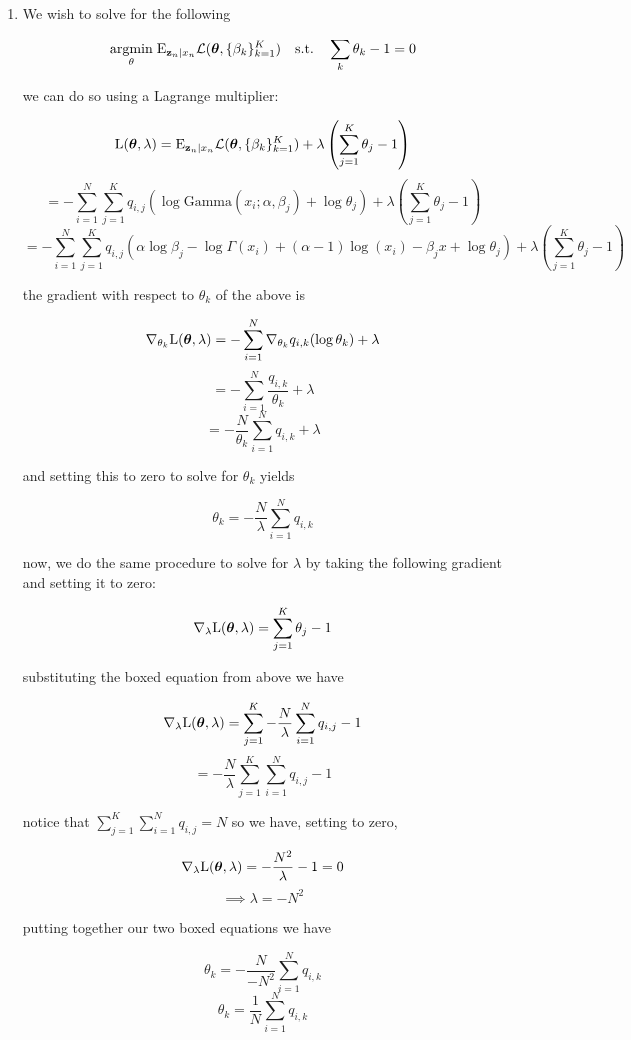 \documentclass[submit]{harvardml}
\begin{document}
\begin{enumerate}
\begin{enumerate}
      \item 
      We wish to solve for the following
      
      $$\underset{\theta}{\mathrm{argmin}}\;\mathrm{E}_{\mathbf{z}_n|x_n}\mathcal{L}(\boldsymbol{\theta},\{\beta_k\}^K_{k=1})\quad\text{s.t.}\quad\sum_k\theta_k -1 = 0$$
      
      we can do so using a Lagrange multiplier:
      
      $$\text{L}(\boldsymbol{\theta}, \lambda) = \mathrm{E}_{\mathbf{z}_n|x_n}\mathcal{L}(\boldsymbol{\theta},\{\beta_k\}^K_{k=1}) + \lambda\left(\sum_{j=1}^K\theta_j-1\right)$$
      $$=-\sum_{i=1}^N\sum_{j=1}^K q_{i,j}\left(\log\mathrm{Gamma}(x_i;\alpha,\beta_j)+\log \theta_j\right)+ \lambda\left(\sum_{j=1}^K\theta_j-1\right)$$
      $$= -\sum_{i=1}^N\sum_{j=1}^K q_{i,j}\left(\alpha\log\beta_j-\log\Gamma(x_i)+(\alpha-1)\log(x_i)-\beta_j x+\log \theta_j\right) + \lambda\left(\sum_{j=1}^K\theta_j-1\right) $$
      
      the gradient with respect to $\theta_k$ of the above is

      $$\nabla_{\theta_k}\text{L}(\boldsymbol{\theta}, \lambda)=-\sum_{i=1}^N\nabla_{\theta_k} q_{i,k}(\log\theta_k)+\lambda$$
      $$=-\sum_{i=1}^N\frac{q_{i,k}}{\theta_k}+\lambda$$
      $$=-\frac{N}{\theta_k}\sum_{i=1}^N q_{i,k}+\lambda$$

      and setting this to zero to solve for $\theta_k$ yields

      $$\boxed{\theta_k =-\frac{N}{\lambda}\sum_{i=1}^N q_{i,k}}$$

      now, we do the same procedure to solve for $\lambda$ by taking the following 
      gradient and setting it to zero:

      $$\nabla_{\lambda}\text{L}(\boldsymbol{\theta}, \lambda)=\sum_{j=1}^K \theta_j -1$$

      substituting the boxed equation from above we have

      $$\nabla_{\lambda}\text{L}(\boldsymbol{\theta}, \lambda)=\sum_{j=1}^K -\frac{N}{\lambda}\sum_{i=1}^N q_{i,j} -1$$
      $$=-\frac{N}{\lambda}\sum_{j=1}^K \sum_{i=1}^N q_{i,j} -1$$

      notice that $\sum_{j=1}^K \sum_{i=1}^N q_{i,j}=N$ so we have, setting to zero,
    
      $$\nabla_{\lambda}\text{L}(\boldsymbol{\theta}, \lambda) =-\frac{N^2}{\lambda}-1=0$$
      $$\implies \boxed{\lambda=-N^2} $$

      putting together our two boxed equations we have

      $$\theta_k =-\frac{N}{-N^2}\sum_{i=1}^N q_{i,k}$$
      $$\boxed{\theta_k =\frac{1}{N}\sum_{i=1}^N q_{i,k}}$$


\end{enumerate}
\end{enumerate}
\end{document}
